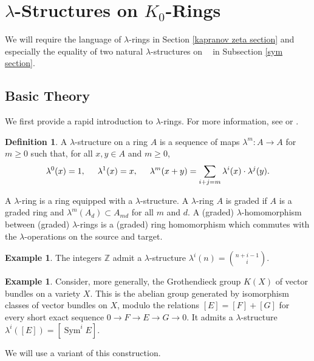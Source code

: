 \documentclass{amsart}
\theoremstyle{definition}
\newtheorem{defn}[thm]{Definition}
\newtheorem{exmp}[thm]{Example}
\DeclareMathOperator{\Sym}{Sym}
\DeclareMathOperator{\Stk}{Stk}
\DeclareMathOperator{\Kstk}{K_0(\Stk_k^{\dim})}
\numberwithin{equation}{section}
\begin{document}
\section{\texorpdfstring{$\lambda$}{λ}-Structures on $K_0$-Rings}
We will require the language of $\lambda$-rings in Section \ref{kapranov zeta section} and especially the equality of two natural $\lambda$-structures on $\Kstk$ in Subsection \ref{sym section}.

\subsection{Basic Theory}
We first provide a rapid introduction to $\lambda$-rings. For more information, see \cite{atiyahtall} or \cite{larsenluntsrationality}.
\begin{defn}
A $\lambda$-structure on a ring $A$ is a sequence of maps $\lambda^m: A \rightarrow A$ for $m \geq 0$ such that, for all $x,y \in A$ and $m \geq 0$,
\begin{align*}
    \lambda^0(x) = 1, \hspace{.5cm} \lambda^1(x) = x, \hspace{.5cm} \lambda^m(x+y) = \sum_{i+j=m}\lambda^i(x) \cdot \lambda^j(y).
\end{align*}

A $\lambda$-ring is a ring equipped with a $\lambda$-structure. A $\lambda$-ring $A$ is graded if $A$ is a graded ring and $\lambda^m(A_d) \subset A_{md}$ for all $m$ and $d$. A (graded) $\lambda$-homomorphism between (graded) $\lambda$-rings is a (graded) ring homomorphism which commutes with the $\lambda$-operations on the source and target.
\end{defn}


\begin{exmp}
The integers $\mathbb{Z}$ admit a $\lambda$-structure $\lambda^i(n) = \binom{n+i-1}{i}$.
\end{exmp}

\begin{exmp}
Consider, more generally, the Grothendieck group $K(X)$ of vector bundles on a variety $X$. This is the abelian group generated by isomorphism classes of vector bundles on $X$, modulo the relations $[E] = [F]+[G]$ for every short exact sequence $0 \rightarrow F \rightarrow E \rightarrow G \rightarrow 0$. It admits a $\lambda$-structure $\lambda^i([E]) = [\Sym^i E]$.
\end{exmp}

We will use a variant of this construction.
\end{document}
